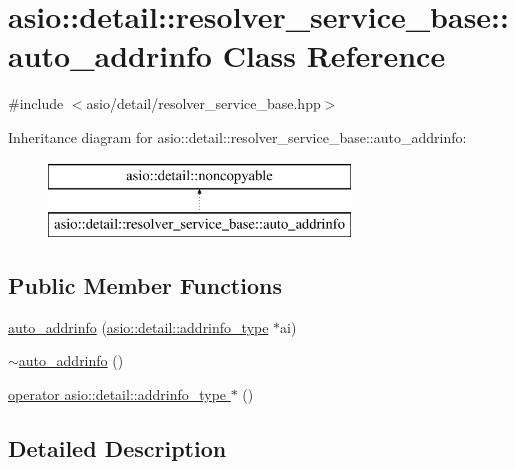 \hypertarget{classasio_1_1detail_1_1resolver__service__base_1_1auto__addrinfo}{}\section{asio\+:\+:detail\+:\+:resolver\+\_\+service\+\_\+base\+:\+:auto\+\_\+addrinfo Class Reference}
\label{classasio_1_1detail_1_1resolver__service__base_1_1auto__addrinfo}


{\ttfamily \#include $<$asio/detail/resolver\+\_\+service\+\_\+base.\+hpp$>$}

Inheritance diagram for asio\+:\+:detail\+:\+:resolver\+\_\+service\+\_\+base\+:\+:auto\+\_\+addrinfo\+:\begin{figure}[H]
\begin{center}
\leavevmode
\includegraphics[height=2.000000cm]{classasio_1_1detail_1_1resolver__service__base_1_1auto__addrinfo}
\end{center}
\end{figure}
\subsection*{Public Member Functions}
\begin{DoxyCompactItemize}
\item 
\hyperlink{classasio_1_1detail_1_1resolver__service__base_1_1auto__addrinfo_a25e9f825df34740e06b34cdf0386b26a}{auto\+\_\+addrinfo} (\hyperlink{namespaceasio_1_1detail_ad8df56a17e3aa9ce2ad251fb76426e67}{asio\+::detail\+::addrinfo\+\_\+type} $\ast$ai)
\item 
\hyperlink{classasio_1_1detail_1_1resolver__service__base_1_1auto__addrinfo_a469491701619048157610db18eea922a}{$\sim$auto\+\_\+addrinfo} ()
\item 
\hyperlink{classasio_1_1detail_1_1resolver__service__base_1_1auto__addrinfo_a4ee7e139a519c6bc31c41f8bafbbc46a}{operator asio\+::detail\+::addrinfo\+\_\+type $\ast$} ()
\end{DoxyCompactItemize}


\subsection{Detailed Description}


